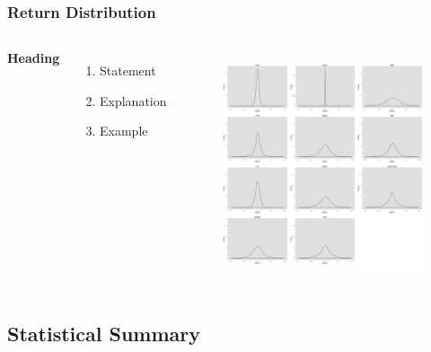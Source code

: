 \documentclass{beamer}
\newcommand\Fontviii{\fontsize{8}{9.2}\selectfont}
\begin{document}
\begin{frame}
\frametitle{Return Distribution}
\Fontviii
\begin{columns}[c] %

\textbf{Heading}
\begin{enumerate}
\item Statement
\item Explanation
\item Example
\end{enumerate}

\begin{figure}[h]
\centering 
\includegraphics[width=6.55cm]{../results/returns_dist}
\label{fig: returnsDist}
\end{figure}
\end{columns}
\end{frame}


\subsection{Statistical Summary}
\end{document}
